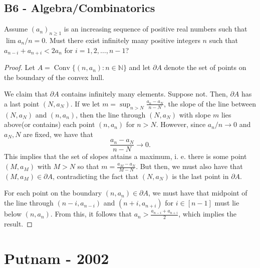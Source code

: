 \documentclass[11pt]{scrartcl}
\newcommand{\N}{\mathbb{N}}
\newcommand{\<}{\langle}
\renewcommand{\>}{\rangle}
\begin{document}
\subsection{B6 - Algebra/Combinatorics}
Assume $(a_n)_{n \ge 1}$ is an increasing sequence of positive real numbers such that $\lim a_n/n = 0$.  Must there exist infinitely many positive integers $n$ such that $a_{n-i} + a_{n+i} < 2a_n$ for $i = 1, 2, \dots, n-1$? 

\begin{proof}
Let $A = \operatorname{Conv}\{(n, a_n) : n \in \N\}$ and let $\partial A$ denote the set of points on the boundary of the convex hull.  

We claim that $\partial A$ contains infinitely many elements.  Suppose not.  Then, $\partial A$ has a last point $(N, a_N)$.  If we let $m = \sup_{n > N} \frac{a_n - a_N}{n - N}$, the slope of the line between $(N, a_N)$ and $(n, a_n)$, then the line through $(N, a_N)$ with slope $m$ lies above(or contains) each point $(n, a_n)$ for $n > N$.  However, since $a_n/n \to 0$ and $a_N, N$ are fixed, we have that $$\frac{a_n - a_N}{n - N} \to 0.$$
This implies that the set of slopes attains a maximum, i. e. there is some point $(M, a_M)$ with $M > N$ so that $m = \frac{a_M - a_N}{M - N}$.  But then, we must also have that $(M, a_M) \in \partial A$, contradicting the fact that $(N, a_N)$ is the last point in $\partial A$.

For each point on the boundary $(n, a_n) \in \partial A$, we must have that midpoint of the line through $(n-i, a_{n-i})$ and $(n+i, a_{n+i})$ for $i \in [n-1]$ must lie below $(n, a_n)$.  From this, it follows that $a_n > \frac{a_{n-i} + a_{n+i}}{2}$, which implies the result.  
\end{proof}


\pagebreak
\section{Putnam - 2002}
\end{document}
